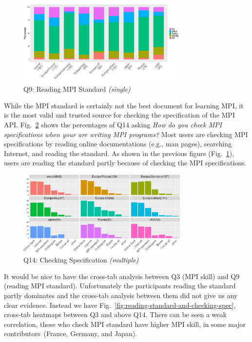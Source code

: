 \documentclass[preprint,5p,times]{elsarticle}
\def\myquote#1{{\it #1}}
\def\mcountries{major contributors\xspace{}}%
\begin{document}
\begin{figure}[htb]
\begin{center}
\includegraphics[width=8.5cm]{R-scripts/Q9.pdf}
\caption{Q9: Reading MPI Standard {\it(single)}}
\label{fig:reading-standard}
\end{center}
\end{figure}

While the MPI standard is certainly not the best document for learning MPI, it
is the most valid and trusted source for checking the specification of the MPI
API. Fig.~\ref{fig:checking-spec} shows the percentages of Q14 asking
\myquote{How do you check MPI specifications when your are writing MPI
programs?} Most users are checking MPI specifications by reading online
documentations (e.g., man pages), searching Internet, and reading the standard.
As shown in the previous figure (Fig.~\ref{fig:reading-standard}), users are
reading the standard partly because of checking the MPI specifications.

\begin{figure}[htb]
\begin{center}
\includegraphics[width=8.5cm]{R-scripts/Q14.pdf}
\caption{Q14: Checking Specification {\it(multiple)}}
\label{fig:checking-spec}
\end{center}
\end{figure}

It would be nice to have the cross-tab analysis between Q3 (MPI skill) and Q9
(reading MPI standard). Unfortunately the participants reading the standard
partly dominates and the cross-tab analysis between them did not give us any
clear evidence.
%
Instead we have Fig.~\ref{fig:reading-standard-and-checking-spec}, cross-tab
heatmaps between Q3 and above Q14. There can be seen a weak correlation, those
who check MPI standard have higher MPI skill, in some \mcountries\  (France,
Germany, and Japan).
\end{document}
